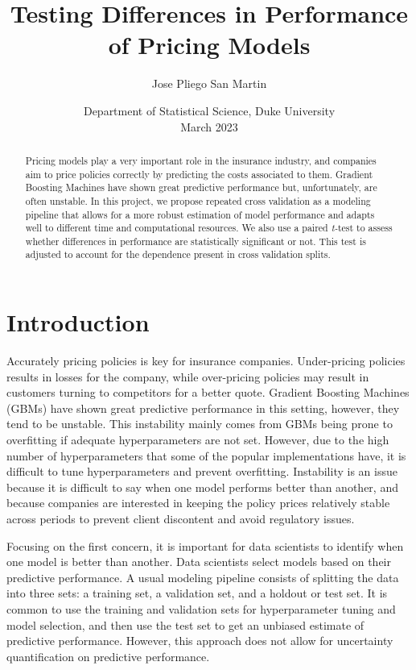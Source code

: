 \documentclass[11pt,a4paper]{article}
\title{Testing Differences in Performance of Pricing Models}
\author{Jose Pliego San Martin}
\date{
	Department of Statistical Science, Duke University\\%
	March 2023
}
\theoremstyle{plain}
\theoremstyle{definition}
\begin{document}
\maketitle

\nocite{*}
	
\begin{abstract}
Pricing models play a very important role in the insurance industry, and companies aim to price policies correctly by predicting the costs associated to them. Gradient Boosting Machines have shown great predictive performance but, unfortunately, are often unstable. In this project, we propose repeated cross validation as a modeling pipeline that allows for a more robust estimation of model performance and adapts well to different time and computational resources. We also use a paired \textit{t-}test to assess whether differences in performance are statistically significant or not. This test is adjusted to account for the dependence present in cross validation splits.
\end{abstract}

	
\section{Introduction}
\label{sec:intro}
Accurately pricing policies is key for insurance companies. Under-pricing policies results in losses for the company, while over-pricing policies may result in customers turning to competitors for a better quote. Gradient Boosting Machines (GBMs) have shown great predictive performance in this setting, however, they tend to be unstable. This instability mainly comes from GBMs being prone to overfitting if adequate hyperparameters are not set. However, due to the high number of hyperparameters that some of the popular implementations have, it is difficult to tune hyperparameters and prevent overfitting. Instability is an issue because it is difficult to say when one model performs better than another, and because companies are interested in keeping the policy prices relatively stable across periods to prevent client discontent and avoid regulatory issues.

Focusing on the first concern, it is important for data scientists to identify when one model is better than another. Data scientists select models based on their predictive performance. A usual modeling pipeline consists of splitting the data into three sets: a training set, a validation set, and a holdout or test set. It is common to use the training and validation sets for hyperparameter tuning and model selection, and then use the test set to get an unbiased estimate of predictive performance. However, this approach does not allow for uncertainty quantification on predictive performance.
\end{document}
